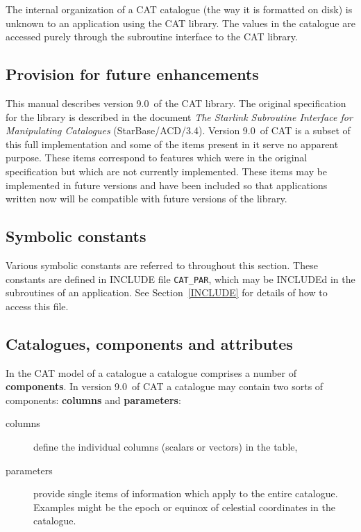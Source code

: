 \documentclass[11pt,twoside]{starlink}
\providecommand{\CATversion}{9.0~}
\begin{document}
The internal organization of a CAT catalogue (the way it is formatted
on disk) is unknown to an application using the CAT library. The values
in the catalogue are accessed purely through the subroutine interface to
the CAT library.


\subsection{Provision for future enhancements}

This manual describes version \CATversion of the CAT library.  The
original specification for the library is described in the document \textit{The Starlink Subroutine Interface for Manipulating Catalogues}
(StarBase/ACD/3.4)\cite{STARBASE34}.  Version \CATversion of CAT is a
subset of this full implementation and some of the items present in it
serve no apparent purpose.  These items correspond to features which were
in the original specification but which are not currently implemented.
These items may be implemented in future versions and have been included
so that applications written now will be compatible with future versions
of the library.

\subsection{Symbolic constants}

Various symbolic constants are referred to throughout this section.
These constants are defined in INCLUDE file \texttt{CAT\_PAR}, which may
be INCLUDEd in the subroutines of an application. See
Section~\ref{INCLUDE} for details of how to access this file.


\subsection{\label{CCA}Catalogues, components and attributes}

In the CAT model of a catalogue a catalogue comprises a number of \textbf{components}. In version \CATversion of CAT a catalogue may contain
two sorts of components: \textbf{columns} and \textbf{parameters}:

\begin{description}

  \item[columns] define the individual columns (scalars or vectors) in
   the table,

  \item[parameters] provide single items of information which apply to
   the entire catalogue. Examples might be the epoch or equinox of
   celestial coordinates in the catalogue.


\end{description}
\end{document}
